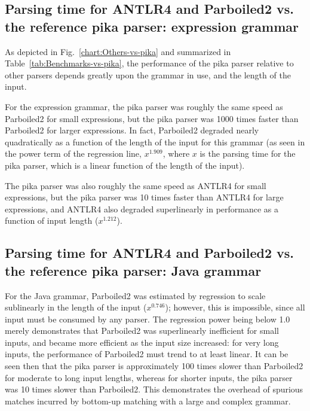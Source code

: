 \documentclass[manuscript,screen]{acmart}
\begin{document}
\subsection{Parsing time for ANTLR4 and Parboiled2 vs. the reference pika parser: expression grammar}

As depicted in Fig.~\ref{chart:Others-vs-pika} and summarized in Table~\ref{tab:Benchmarks-vs-pika}, the performance of the pika parser relative to other parsers depends greatly upon the grammar in use, and the length of the input.

For the expression grammar, the pika parser was roughly the same speed as Parboiled2 for small expressions, but the pika parser was 1000 times faster than Parboiled2 for larger expressions. In fact, Parboiled2 degraded nearly quadratically as a function of the length of the input for this grammar (as seen in the power term of the regression line, $x^{1.909}$, where $x$ is the parsing time for the pika parser, which is a linear function of the length of the input).

The pika parser was also roughly the same speed as ANTLR4 for small expressions, but the pika parser was 10 times faster than ANTLR4 for large expressions, and ANTLR4 also degraded superlinearly in performance as a function of input length ($x^{1.212}$).

\subsection{Parsing time for ANTLR4 and Parboiled2 vs. the reference pika parser: Java grammar}

For the Java grammar, Parboiled2 was estimated by regression to scale sublinearly in the length of the input ($x^{0.746}$); however, this is impossible, since all input must be consumed by any parser. The regression power being below 1.0 merely demonstrates that Parboiled2 was superlinearly inefficient for small inputs, and became more efficient as the input size increased: for very long inputs, the performance of Parboiled2 must trend to at least linear. It can be seen then that the pika parser is approximately 100 times slower than Parboiled2 for moderate to long input lengths, whereas for shorter inputs, the pika parser was 10 times slower than Parboiled2. This demonstrates the overhead of spurious matches incurred by bottom-up matching with a large and complex grammar.
\end{document}
